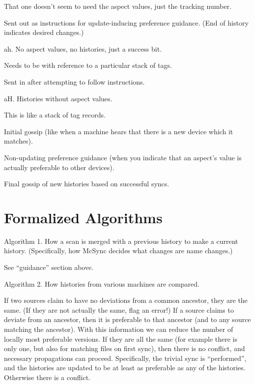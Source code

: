 \documentclass{book}
\begin{document}
		That one doesn't seem to need the aspect values, just the tracking number.

	Sent out as instructions for update-inducing preference guidance.  (End of history indicates desired changes.)

ah. No aspect values, no histories, just a success bit.

		Needs to be with reference to a particular stack of tags.

	Sent in after attempting to follow instructions.

aH. Histories without aspect values.

		This is like a stack of tag records.

	Initial gossip (like when a machine hears that there is a new device which it matches).

	Non-updating preference guidance (when you indicate that an aspect's value is actually preferable to other devices).

	Final gossip of new histories based on successful syncs.






\section{Formalized Algorithms}

Algorithm 1.   How a scan is merged with a previous history to make a current history.  (Specifically, how McSync decides what changes are name changes.)

See ``guidance'' section above.



Algorithm 2.   How histories from various machines are compared.

If two sources claim to have no deviations from a common ancestor, they are the same.  (If they are not actually the same, flag an error!)
If a source claims to deviate from an ancestor, then it is preferable to that ancestor (and to any source matching the ancestor).
With this information we can reduce the number of locally most preferable versions.
If they are all the same (for example there is only one, but also for matching files on first sync), then there is no conflict, and necessary propagations can proceed.  Specifically, the trivial sync is ``performed'', and the histories are updated to be at least as preferable as any of the histories.
Otherwise there is a conflict.
\end{document}
